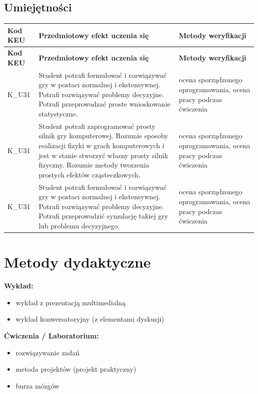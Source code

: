 \documentclass[12pt, a4paper]{article}
\newcommand{\thdrule}{\noalign{\global\setlength{\extrarowheight}{0pt}}}
\newcommand{\thdend}{\noalign{\global\setlength{\extrarowheight}{3pt}}}
\begin{document}
\subsection*{Umiejętności}
{\scriptsize
\begin{longtable}{m{1.6cm}m{9.0cm}m{4.2cm}}
\thdrule\toprule
\rowcolor{pjatkRed} {\color{white}\footnotesize\textbf{\vphantom{Ag}Kod KEU}} & {\color{white}\footnotesize\textbf{\vphantom{Ag}Przedmiotowy efekt uczenia się}} & {\color{white}\footnotesize\textbf{\vphantom{Ag}Metody weryfikacji}} \\
\midrule\thdend
\endfirsthead
\thdrule\toprule
\rowcolor{pjatkRed} {\color{white}\footnotesize\textbf{\vphantom{Ag}Kod KEU}} & {\color{white}\footnotesize\textbf{\vphantom{Ag}Przedmiotowy efekt uczenia się}} & {\color{white}\footnotesize\textbf{\vphantom{Ag}Metody weryfikacji}} \\
\midrule\thdend
\endhead
  \rowcolor{tableRowLight} K\_U31 & Student potrafi formułować i  rozwiązywać gry w postaci normalnej i ekstensywnej. Potrafi rozwiązywać problemy decyzyjne.  Potrafi przeprowadzać proste wnioskowanie statystyczne. & ocena sporządzonego oprogramowania, ocena pracy podczas ćwiczenia \\
  \rowcolor{tableRowAlt} K\_U31 & Student potrafi zaprogramować prosty silnik gry komputerowej. Rozumie sposoby realizacji fizyki w grach komputerowych i jest w stanie stworzyć własny prosty silnik fizyczny. Rozumie metody tworzenia prostych efektów cząsteczkowych. & ocena sporządzonego oprogramowania, ocena pracy podczas ćwiczenia \\
  \rowcolor{tableRowLight} K\_U31 & Student potrafi formułować i  rozwiązywać gry w postaci normalnej i ekstensywnej. Potrafi rozwiązywać problemy decyzyjne. Potrafi przeprowadzić symulację takiej gry lub problemu decyzyjnego. & ocena sporządzonego oprogramowania, ocena pracy podczas ćwiczenia \\
\bottomrule
\end{longtable}}

\section{Metody dydaktyczne}

\textbf{Wykład:}
\begin{itemize}
  \item wykład z prezentacją multimedialną
  \item wykład konwersatoryjny (z elementami dyskusji)
\end{itemize}
\vspace{4pt}
\textbf{Ćwiczenia / Laboratorium:}
\begin{itemize}
  \item rozwiązywanie zadań
  \item metoda projektów (projekt praktyczny)
  \item burza mózgów
\end{itemize}
\vspace{4pt}
\end{document}
